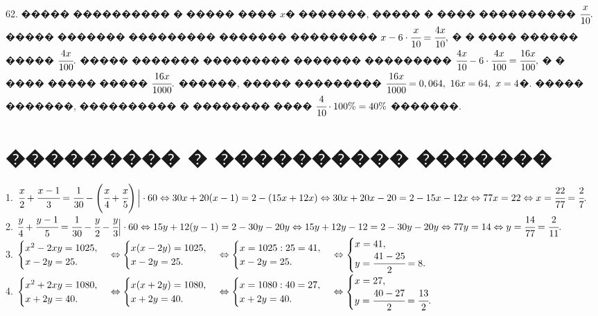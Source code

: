 \documentclass[12pt]{article}
\begin{document}
62. ����� ���������� � ����� ���� $x$� �������, ����� � ���� ���������� $\cfrac{x}{10}.$ ����� ������� ��������� ������� ��������� $x-6\cdot\cfrac{x}{10}=\cfrac{4x}{10},$ � � ���� ������ ����� $\cfrac{4x}{100}.$ ����� ������� ��������� ������� ��������� $\cfrac{4x}{10}-6\cdot\cfrac{4x}{100}=\cfrac{16x}{100},$ � � ���� ����� ����� $\cfrac{16x}{1000}.$ ������, ����� ��������� $\cfrac{16x}{1000}=0,064,\ 16x=64,\ x=4$�. ����� �������, ���������� � �������� ���� $\cfrac{4}{10}\cdot100\%=40\%$ �������.
\newpage
\section{��������� � ���������� �������}
1. $\cfrac{x}{2}+\cfrac{x-1}{3}=\cfrac{1}{30}-\left(\cfrac{x}{4}+\cfrac{x}{5}\right)\Big|\cdot60\Leftrightarrow30x+20(x-1)=2-(15x+12x)\Leftrightarrow30x+20x-20=2-15x-12x
\Leftrightarrow77x=22\Leftrightarrow x=\cfrac{22}{77}=\cfrac{2}{7}.$\\
2. $\cfrac{y}{4}+\cfrac{y-1}{5}=\cfrac{1}{30}-\cfrac{y}{2}-\cfrac{y}{3}\Big|\cdot60\Leftrightarrow15y+12(y-1)=2-30y-20y\Leftrightarrow15y+12y-12=2-30y-20y
\Leftrightarrow77y=14\Leftrightarrow y=\cfrac{14}{77}=\cfrac{2}{11}.$\\
3. $\begin{cases} x^2-2xy=1025,\\x-2y=25.\end{cases}\Leftrightarrow\begin{cases} x(x-2y)=1025,\\x-2y=25.\end{cases}
\Leftrightarrow\begin{cases} x=1025:25=41,\\x-2y=25.\end{cases}\Leftrightarrow\begin{cases} x=41,\\y=\cfrac{41-25}{2}=8.\end{cases}$\\
4. $\begin{cases} x^2+2xy=1080,\\x+2y=40.\end{cases}\Leftrightarrow\begin{cases} x(x+2y)=1080,\\x+2y=40.\end{cases}\Leftrightarrow\begin{cases} x=1080:40=27,\\x+2y=40.\end{cases}\Leftrightarrow\begin{cases} x=27,\\y=\cfrac{40-27}{2}=\cfrac{13}{2}.\end{cases}$\\
\end{document}
